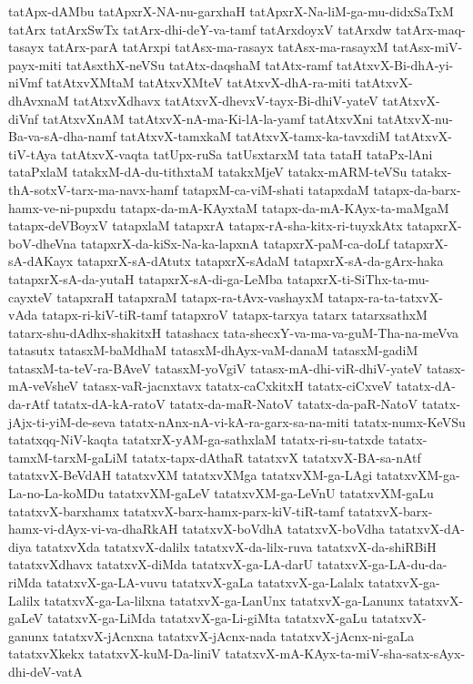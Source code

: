 {tatApx-dAMbu
tatApxrX-NA-nu-garxhaH
tatApxrX-Na-liM-ga-mu-didxSaTxM
tatArx
tatArxSwTx
tatArx-dhi-deY-va-tamf
tatArxdoyxV
tatArxdw
tatArx-maq-tasayx
tatArx-parA
tatArxpi
tatAsx-ma-rasayx
tatAsx-ma-rasayxM
tatAsx-miV-payx-miti
tatAsxthX-neVSu
tatAtx-daqshaM
tatAtx-ramf
tatAtxvX-Bi-dhA-yi-niVmf
tatAtxvXMtaM
tatAtxvXMteV
tatAtxvX-dhA-ra-miti
tatAtxvX-dhAvxnaM
tatAtxvXdhavx
tatAtxvX-dhevxV-tayx-Bi-dhiV-yateV
tatAtxvX-diVnf
tatAtxvXnAM
tatAtxvX-nA-ma-Ki-lA-la-yamf
tatAtxvXni
tatAtxvX-nu-Ba-va-sA-dha-namf
tatAtxvX-tamxkaM
tatAtxvX-tamx-ka-tavxdiM
tatAtxvX-tiV-tAya
tatAtxvX-vaqta
tatUpx-ruSa
tatUsxtarxM
tata
tataH
tataPx-lAni
tataPxlaM
tatakxM-dA-du-tithxtaM
tatakxMjeV
tatakx-mARM-teVSu
tatakx-thA-sotxV-tarx-ma-navx-hamf
tatapxM-ca-viM-shati
tatapxdaM
tatapx-da-barx-hamx-ve-ni-pupxdu
tatapx-da-mA-KAyxtaM
tatapx-da-mA-KAyx-ta-maMgaM
tatapx-deVBoyxV
tatapxlaM
tatapxrA
tatapx-rA-sha-kitx-ri-tuyxkAtx
tatapxrX-boV-dheVna
tatapxrX-da-kiSx-Na-ka-lapxnA
tatapxrX-paM-ca-doLf
tatapxrX-sA-dAKayx
tatapxrX-sA-dAtutx
tatapxrX-sAdaM
tatapxrX-sA-da-gArx-haka
tatapxrX-sA-da-yutaH
tatapxrX-sA-di-ga-LeMba
tatapxrX-ti-SiThx-ta-mu-cayxteV
tatapxraH
tatapxraM
tatapx-ra-tAvx-vashayxM
tatapx-ra-ta-tatxvX-vAda
tatapx-ri-kiV-tiR-tamf
tatapxroV
tatapx-tarxya
tatarx
tatarxsathxM
tatarx-shu-dAdhx-shakitxH
tatashacx
tata-shecxY-va-ma-va-guM-Tha-na-meVva
tatasutx
tatasxM-baMdhaM
tatasxM-dhAyx-vaM-danaM
tatasxM-gadiM
tatasxM-ta-teV-ra-BAveV
tatasxM-yoVgiV
tatasx-mA-dhi-viR-dhiV-yateV
tatasx-mA-veVsheV
tatasx-vaR-jacnxtavx
tatatx-caCxkitxH
tatatx-ciCxveV
tatatx-dA-da-rAtf
tatatx-dA-kA-ratoV
tatatx-da-maR-NatoV
tatatx-da-paR-NatoV
tatatx-jAjx-ti-yiM-de-seva
tatatx-nAnx-nA-vi-kA-ra-garx-sa-na-miti
tatatx-numx-KeVSu
tatatxqq-NiV-kaqta
tatatxrX-yAM-ga-sathxlaM
tatatx-ri-su-tatxde
tatatx-tamxM-tarxM-gaLiM
tatatx-tapx-dAthaR
tatatxvX
tatatxvX-BA-sa-nAtf
tatatxvX-BeVdAH
tatatxvXM
tatatxvXMga
tatatxvXM-ga-LAgi
tatatxvXM-ga-La-no-La-koMDu
tatatxvXM-gaLeV
tatatxvXM-ga-LeVnU
tatatxvXM-gaLu
tatatxvX-barxhamx
tatatxvX-barx-hamx-parx-kiV-tiR-tamf
tatatxvX-barx-hamx-vi-dAyx-vi-va-dhaRkAH
tatatxvX-boVdhA
tatatxvX-boVdha
tatatxvX-dA-diya
tatatxvXda
tatatxvX-dalilx
tatatxvX-da-lilx-ruva
tatatxvX-da-shiRBiH
tatatxvXdhavx
tatatxvX-diMda
tatatxvX-ga-LA-darU
tatatxvX-ga-LA-du-da-riMda
tatatxvX-ga-LA-vuvu
tatatxvX-gaLa
tatatxvX-ga-Lalalx
tatatxvX-ga-Lalilx
tatatxvX-ga-La-lilxna
tatatxvX-ga-LanUnx
tatatxvX-ga-Lanunx
tatatxvX-gaLeV
tatatxvX-ga-LiMda
tatatxvX-ga-Li-giMta
tatatxvX-gaLu
tatatxvX-ganunx
tatatxvX-jAcnxna
tatatxvX-jAcnx-nada
tatatxvX-jAcnx-ni-gaLa
tatatxvXkekx
tatatxvX-kuM-Da-liniV
tatatxvX-mA-KAyx-ta-miV-sha-satx-sAyx-dhi-deV-vatA
}
